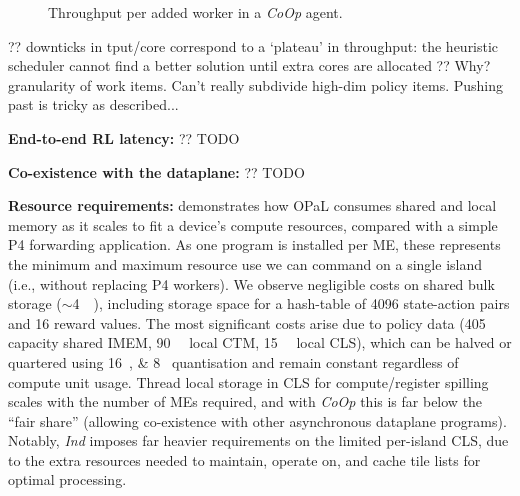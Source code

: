 \documentclass[sigconf,natbib=false]{acmart}
\newcommand{\fakepara}[1]{\noindent\textbf{#1:}}
\newcommand{\approachshort}{OPaL}
\newcommand{\Coopfw}{\emph{CoOp}}
\newcommand{\Indfw}{\emph{Ind}}
\begin{document}
\begin{figure}
	\caption{Throughput per added worker in a \Coopfw{} agent. \label{fig:tput-per-core}}
\end{figure}

?? downticks in tput/core correspond to a `plateau' in throughput: the heuristic scheduler cannot find a better solution until extra cores are allocated
?? Why? granularity of work items. Can't really subdivide high-dim policy items. Pushing past is tricky as described...

\fakepara{End-to-end RL latency}
?? TODO

\fakepara{Co-existence with the dataplane}
?? TODO

\fakepara{Resource requirements}
 demonstrates how \approachshort{} consumes shared and local memory as it scales to fit a device's compute resources, compared with a simple P4 forwarding application.
As one program is installed per ME, these represents the minimum and maximum resource use we can command on a single island (i.e., without replacing P4 workers).
We observe negligible costs on shared bulk storage ($\sim$\SI{4}{\mebi\byte}), including storage space for a hash-table of \num{4096} state-action pairs and \num{16} reward values.
The most significant costs arise due to policy data (\SI{405}{\kibi\byte} capacity shared IMEM, \SI{90}{\kibi\byte} local CTM, \SI{15}{\kibi\byte} local CLS), which can be halved or quartered using \SIlist{16;8}{\bit} quantisation and remain constant regardless of compute unit usage.
Thread local storage in CLS for compute/register spilling scales with the number of MEs required, and with \Coopfw{} this is far below the ``fair share'' (allowing co-existence with other asynchronous dataplane programs).
Notably, \Indfw{} imposes far heavier requirements on the limited per-island CLS, due to the extra resources needed to maintain, operate on, and cache tile lists for optimal processing.
\end{document}
